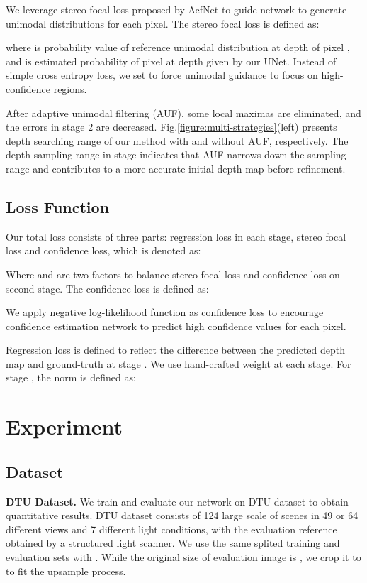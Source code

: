 \documentclass{article}
\begin{document}
We leverage stereo focal loss proposed by AcfNet \cite{zhang2020adaptive} to guide network to generate unimodal distributions for each pixel.
The stereo focal loss is defined as:

where  is probability value of reference unimodal distribution at depth  of pixel , and  is estimated probability of pixel  at depth  given by our UNet.
Instead of simple cross entropy loss, we set  to force unimodal guidance to focus on high-confidence regions.

After adaptive unimodal filtering (AUF), some local maximas are eliminated, and the errors in stage 2 are decreased.
Fig.\ref{figure:multi-strategies}(left) presents depth searching range of our method with and without AUF, respectively.
The depth sampling range in  stage indicates that AUF narrows down the sampling range and contributes to a more accurate initial depth map before refinement.


\subsection{Loss Function}
Our total loss consists of three parts: regression loss in each stage, stereo focal loss and confidence loss, which is denoted as:

Where  and  are two factors to balance stereo focal loss and confidence loss on second stage.
The confidence loss  is defined as: 


We apply negative log-likelihood function as confidence loss to encourage confidence estimation network to predict high confidence values for each pixel.

Regression loss  is defined to reflect the difference between the predicted depth map and ground-truth at stage .
We use hand-crafted weight  at each stage.
For stage , the  norm is defined as:


\section{Experiment}
\subsection{Dataset}
{\bf DTU Dataset.}
We train and evaluate our network on DTU dataset \cite{aanaes2016large} to obtain quantitative results.
DTU dataset \cite{aanaes2016large} consists of 124 large scale of scenes in 49 or 64 different views and 7 different light conditions, with the evaluation reference obtained by a structured light scanner.
We use the same splited training and evaluation sets with \cite{yao2020blendedmvs,yang2020cost}.
While the original size of evaluation image is , we crop it to  to fit the upsample process. 
\end{document}
